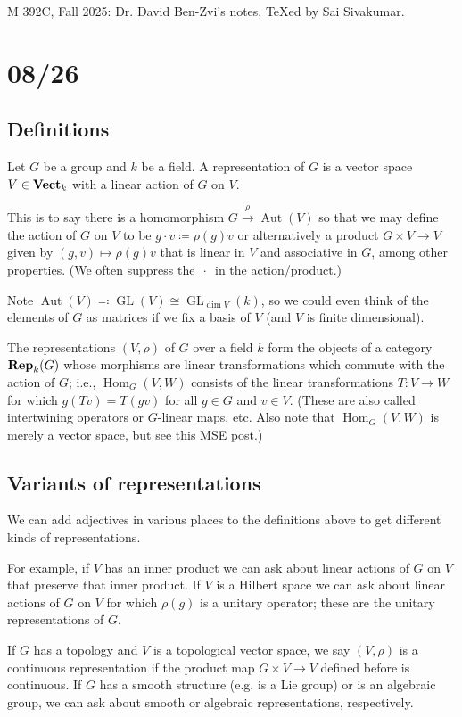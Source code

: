 \documentclass[11pt,leqno]{article}
\theoremstyle{plain}
\theoremstyle{definition}
\numberwithin{equation}{section}
\numberwithin{lem}{section}
\DeclareMathOperator{\GL}{GL}
\DeclareMathOperator{\Hom}{Hom}
\DeclareMathOperator{\Aut}{Aut}
\newcommand{\catname}[1]{{\normalfont\mathbf{#1}}}
\newcommand{\Vect}{\catname{Vect}}
\newcommand{\Rep}{\catname{Rep}}
\begin{document}
M 392C, Fall 2025: Dr. David Ben-Zvi's notes, \TeX ed by Sai Sivakumar.

\section{08/26}
\subsection{Definitions}
Let $G$ be a group and $k$ be a field. A representation of $G$ is a vector space $V\in \Vect_k$ with a linear action of $G$ on $V$.

This is to say there is a homomorphism $G\xrightarrow{\rho}\Aut(V)$ so that we may define the action of $G$ on $V$ to be $g\cdot v \coloneqq \rho(g)v$ or alternatively a product $G\times V\to V$ given by $(g,v)\mapsto \rho(g)v$ that is linear in $V$ and associative in $G$, among other properties. (We often suppress the $\,\cdot\,$ in the action/product.)

Note $\Aut(V) \eqqcolon \GL(V) \cong \GL_{\dim V}(k)$, so we could even think of the elements of $G$ as matrices if we fix a basis of $V$ (and $V$ is finite dimensional).

The representations $(V,\rho)$ of $G$ over a field $k$ form the objects of a category $\Rep_k(G)$ whose morphisms are linear transformations which commute with the action of $G$; i.e., $\Hom_G(V,W)$ consists of the linear transformations $T\colon V\to W$ for which $g(Tv) = T(gv)$ for all $g\in G$ and $v\in V$. (These are also called intertwining operators or $G$-linear maps, etc. Also note that $\Hom_G(V,W)$ is merely a vector space, but see \href{https://math.stackexchange.com/questions/2334514/whats-the-internal-hom-of-linear-representations-of-categories}{this MSE post}.) 

\subsection{Variants of representations}
We can add adjectives in various places to the definitions above to get different kinds of representations. 

For example, if $V$ has an inner product we can ask about linear actions of $G$ on $V$ that preserve that inner product. If $V$ is a Hilbert space we can ask about linear actions of $G$ on $V$ for which $\rho(g)$ is a unitary operator; these are the unitary representations of $G$.

If $G$ has a topology and $V$ is a topological vector space, we say $(V,\rho)$ is a continuous representation if the product map $G\times V\to V$ defined before is continuous. If $G$ has a smooth structure (e.g. is a Lie group) or is an algebraic group, we can ask about smooth or algebraic representations, respectively.
\end{document}
